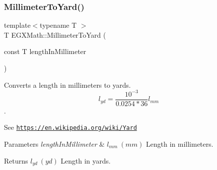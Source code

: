 \subsubsection{\texorpdfstring{Millimeter\+To\+Yard()}{MillimeterToYard()}}
{\footnotesize\ttfamily template$<$typename T $>$ \\
T E\+G\+X\+Math\+::\+Millimeter\+To\+Yard (\begin{DoxyParamCaption}\item[{const T}]{length\+In\+Millimeter }\end{DoxyParamCaption})}



Converts a length in millimeters to yards. \[ l_{yd}= \frac{10^{-3}}{0.0254 * 36} l_{mm} \]. 

See \href{https://en.wikipedia.org/wiki/Yard}{\tt https\+://en.\+wikipedia.\+org/wiki/\+Yard} 
\begin{DoxyParams}{Parameters}
{\em length\+In\+Millimeter} & $ l_{mm}\ (mm)$ Length in millimeters. \\
\hline
\end{DoxyParams}
\begin{DoxyReturn}{Returns}
$ l_{yd}\ (yd)$ Length in yards. 
\end{DoxyReturn}
